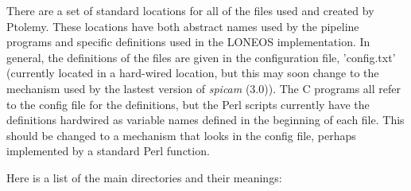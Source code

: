 \documentclass{article}
\newcommand\pr{\em}                   %
\begin{document}
There are a set of standard locations for all of the files used and
created by Ptolemy.  These locations have both abstract names used by
the pipeline programs and specific definitions used in the LONEOS
implementation.  In general, the definitions of the files are given in
the configuration file, 'config.txt' (currently located in a
hard-wired location, but this may soon change to the mechanism used by
the lastest version of {\pr spicam} (3.0)).  The C programs all refer
to the config file for the definitions, but the Perl scripts currently
have the definitions hardwired as variable names defined in the
beginning of each file.  This should be changed to a mechanism that
looks in the config file, perhaps implemented by a standard Perl
function.

Here is a list of the main directories and their meanings:
\end{document}
